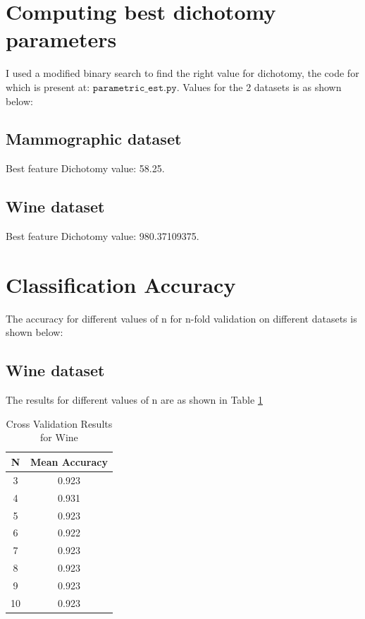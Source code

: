 \documentclass[11pt, pdftex]{article}
\begin{document}
\section{Computing best dichotomy parameters}
I used a modified binary search to find the right value for dichotomy, the code for which is present at: $\texttt{parametric\_est.py}$. Values for the 2 datasets is as shown below:
\subsection{Mammographic dataset}
Best feature Dichotomy value: 58.25.\\
\subsection{Wine dataset}
Best feature Dichotomy value: 980.37109375.\\
\section{Classification Accuracy}
The accuracy for different values of n for n-fold validation on different datasets is shown below:
\subsection{Wine dataset}
The results for different values of n are as shown in Table \ref{tab:wine}
\begin{table}
\centering
\begin{tabular}{ | c | c |}
    \hline
    {\bf N} & {\bf Mean Accuracy} \\ 
    \hline
    3 & 0.923\\
	\hline
	4 & 0.931\\
	\hline
	5 & 0.923\\
	\hline
	6 & 0.922\\
	\hline
	7 & 0.923\\
	\hline
	8 & 0.923\\
	\hline
	9 & 0.923\\
	\hline
	10 & 0.923\\
	\hline
	\end{tabular}
	\caption{Cross Validation Results for Wine}
    \label{tab:wine}
\end{table}
\end{document}

